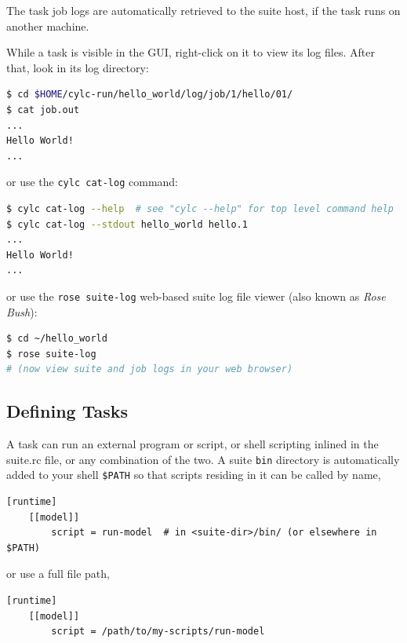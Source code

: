 \begin{shaded*}
The task job logs are automatically retrieved to the suite host, if the task
runs on another machine.

While a task is visible in the GUI, right-click on it to view its log files.
After that, look in its log directory:

\begin{lstlisting}[language=bash]
$ cd $HOME/cylc-run/hello_world/log/job/1/hello/01/
$ cat job.out
...
Hello World!
...
\end{lstlisting}

or use the \lstinline{cylc cat-log} command:

\begin{lstlisting}[language=bash]
$ cylc cat-log --help  # see "cylc --help" for top level command help
$ cylc cat-log --stdout hello_world hello.1
...
Hello World!
...
\end{lstlisting}

or use the \lstinline{rose suite-log} web-based suite log file viewer (also known as {\em Rose Bush}):

\begin{lstlisting}[language=bash]
$ cd ~/hello_world
$ rose suite-log
# (now view suite and job logs in your web browser)
\end{lstlisting}

\end{shaded*}

\subsection{Defining Tasks}

A task can run an external program or script, or shell scripting
inlined in the suite.rc file, or any combination of the two.  A suite
\lstinline{bin} directory is automatically added to your shell
\lstinline{$PATH} so that scripts residing in it can be called by name,

\begin{lstlisting}[language=suiterc]
[runtime]
    [[model]]
        script = run-model  # in <suite-dir>/bin/ (or elsewhere in $PATH)
\end{lstlisting}

or use a full file path,

\begin{lstlisting}[language=suiterc]
[runtime]
    [[model]]
        script = /path/to/my-scripts/run-model
\end{lstlisting}

